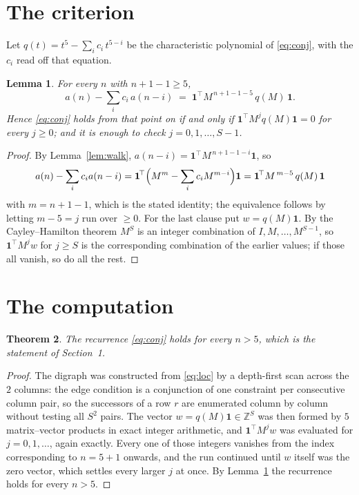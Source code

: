 \documentclass[11pt,a4paper]{article}
\theoremstyle{plain}
\newtheorem{theorem}{Theorem}
\newtheorem{lemma}[theorem]{Lemma}
\theoremstyle{definition}
\begin{document}
\section{The criterion}

Let $q(t)=t^{5}-\sum_i c_i\,t^{5-i}$ be the characteristic polynomial of
\eqref{eq:conj}, with the $c_i$ read off that equation.

\begin{lemma}\label{lem:crit}
For every $n$ with $n+1-1\ge5$,
\[
a(n)-\sum_i c_i\,a(n-i)\;=\;\mathbf{1}^{\!\top}M^{\,n+1-1-5}\,q(M)\,\mathbf{1} .
\]
Hence \eqref{eq:conj} holds from that point on if and only if
$\mathbf{1}^{\!\top}M^{j}q(M)\mathbf{1}=0$ for every $j\ge0$; and it is enough to check
$j=0,1,\dots,S-1$.
\end{lemma}

\begin{proof}
By Lemma~\ref{lem:walk}, $a(n-i)=\mathbf{1}^{\!\top}M^{\,n+1-1-i}\mathbf{1}$, so
\[
a(n)-\sum_i c_i a(n-i)
=\mathbf{1}^{\!\top}\Bigl(M^{m}-\sum_i c_i M^{m-i}\Bigr)\mathbf{1}
=\mathbf{1}^{\!\top}M^{\,m-5}\,q(M)\,\mathbf{1}
\]
with $m=n+1-1$, which is the stated identity; the equivalence follows by letting
$m-5=j$ run over $\ge0$. For the last clause put $w=q(M)\mathbf{1}$. By the
Cayley--Hamilton theorem $M^{S}$ is an integer combination of $I,M,\dots,M^{S-1}$, so
$\mathbf{1}^{\!\top}M^{j}w$ for $j\ge S$ is the corresponding combination of the earlier
values; if those all vanish, so do all the rest.
\end{proof}

\section{The computation}

\begin{theorem}
The recurrence \eqref{eq:conj} holds for every $n>5$, which is the statement of
Section~1.
\end{theorem}

\begin{proof}
The digraph was constructed from \eqref{eq:loc} by a depth-first scan across the $2$
columns: the edge condition is a conjunction of one constraint per consecutive column
pair, so the successors of a row $r$ are enumerated column by column without testing all
$S^2$ pairs. The vector $w=q(M)\mathbf{1}\in\mathbb{Z}^{S}$ was then formed by $5$
matrix--vector products in exact integer arithmetic, and $\mathbf{1}^{\!\top}M^{j}w$ was
evaluated for $j=0,1,\dots$, again exactly. Every one of those integers vanishes from the
index corresponding to $n=5+1$ onwards, and the run continued until $w$ itself was the
zero vector, which settles every larger $j$ at once. By Lemma~\ref{lem:crit} the recurrence
holds for every $n>5$.
\end{proof}
\end{document}
